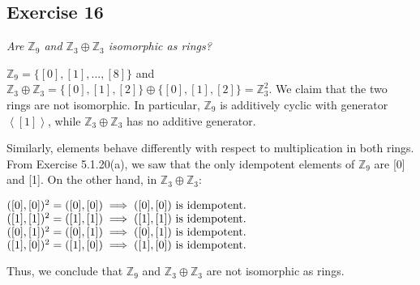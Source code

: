 \subsection*{Exercise 16}
\textit{Are $\mathbb{Z}_9$ and $\mathbb{Z}_3\oplus\mathbb{Z}_3$ isomorphic as rings?}

\vspace{5 mm}
$\mathbb{Z}_9 = \{[0], [1],...,[8]\}$ and $\mathbb{Z}_3\oplus\mathbb{Z}_3 = \{[0],[1],[2]\}\oplus \{[0],[1],[2]\} = \mathbb{Z}_3^2$. We claim that the two rings are not isomorphic. In particular, $\mathbb{Z}_9$ is additively cyclic with generator $\left< [1] \right>$, while $\mathbb{Z}_3 \oplus \mathbb{Z}_3$ has no additive generator.

Similarly, elements behave differently with respect to multiplication in both rings. From Exercise 5.1.20(a), we saw that the only idempotent elements of $\mathbb{Z}_9$ are [0] and [1]. On the other hand, in $\mathbb{Z}_3\oplus\mathbb{Z}_3$:

$([0],[0])^2 = ([0],[0]) \implies ([0],[0]) \textnormal{ is idempotent.}$ \\
$([1],[1])^2 = ([1],[1]) \implies ([1],[1]) \textnormal{ is idempotent.}$ \\
$([0],[1])^2 = ([0],[1]) \implies ([0],[1]) \textnormal{ is idempotent.}$ \\
$([1],[0])^2 = ([1],[0]) \implies ([1],[0]) \textnormal{ is idempotent.}$

Thus, we conclude that $\mathbb{Z}_9$ and $\mathbb{Z}_3\oplus\mathbb{Z}_3$  are not isomorphic as rings.